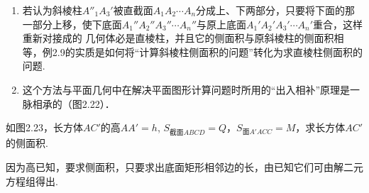 \begin{remark}
\begin{enumerate}
    \item 若认为斜棱柱$A''_1A_3'$被直截面$A_1A_2\cdots A_n$分成上、下两部分，只要将下面的那一部分上移，使下底面$A_1''A_2''A_3''\cdots A_n''$与原上底面$A_1'A_2'A_3'\cdots A_n'$重合，这样重新对接成的
    几何体必是直棱柱，并且它的侧面积与原斜棱柱的侧面积相等，例2.9的实质是如何将“计算斜棱柱侧面积的问题”转化为求直棱柱侧面积的问题.
    \item 这个方法与平面几何中在解决平面图形计算问题时所用的“出入相补”原理是一脉相承的（图2.22）．
\end{enumerate}
\end{remark}

\begin{figure}[htp]
    \centering
{}
    \caption{}
\end{figure}



\begin{example}
    如图2.23，长方体$AC'$的高$AA'=h$, $S_{\text{截面}ABCD}=Q$，$S_{\text{面}A'ACC}=M$，求长方体$AC'$的侧面积.
\end{example}

\begin{analyze}
因为高已知，要求侧面积，只要求出底面矩形相邻边的长，由已知它们可由解二元方程组得出.
\end{analyze}

